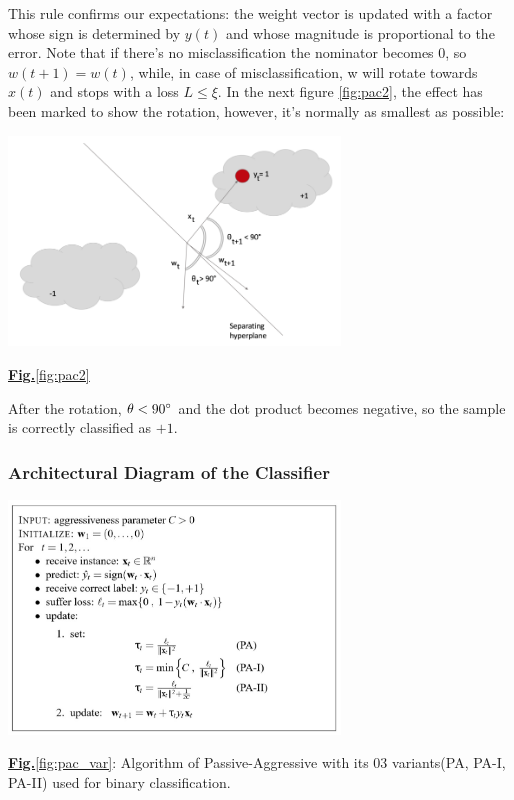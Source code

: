 \documentclass[11.5pt]{article}
\begin{document}
\begin{multicols}{2}
\begin{equation}
\end{equation}
This rule confirms our expectations: the weight vector is updated with a factor whose sign is determined by $y(t)$ and whose magnitude is proportional to the error. Note that if there’s no misclassification the nominator becomes $0$, so $w(t+1) = w(t)$, while, in case of misclassification, w will rotate towards $x(t)$ and stops with a loss $L \leq \xi$. 
\newline
In the next figure \ref{fig:pac2}, the effect has been marked to show the rotation, however, it’s normally as smallest as possible:
\begin{center}
    \centering
    \includegraphics[width=8.8cm]{PAC2.png}
    \caption{\underline{\textbf{Fig.}\ref{fig:pac2}}}
    \label{fig:pac2}
\end{center}
After the rotation, $\theta < 90\degree$ and the dot product becomes negative, so the sample is correctly classified as $+1$.

\subsubsection{Architectural Diagram of the Classifier}
\begin{center}
    \centering
    \includegraphics[width=8.8cm]{Three variants of the Passive-Aggressive algorithm for binary classiﬁcation.jpg}
    \caption{\underline{\textbf{Fig.}\ref{fig:pac_var}}: Algorithm of Passive-Aggressive with its 03 variants(PA, PA-I, PA-II) used for binary classiﬁcation.}
    \label{fig:pac_var}
\end{center}


\end{multicols}
\end{document}
